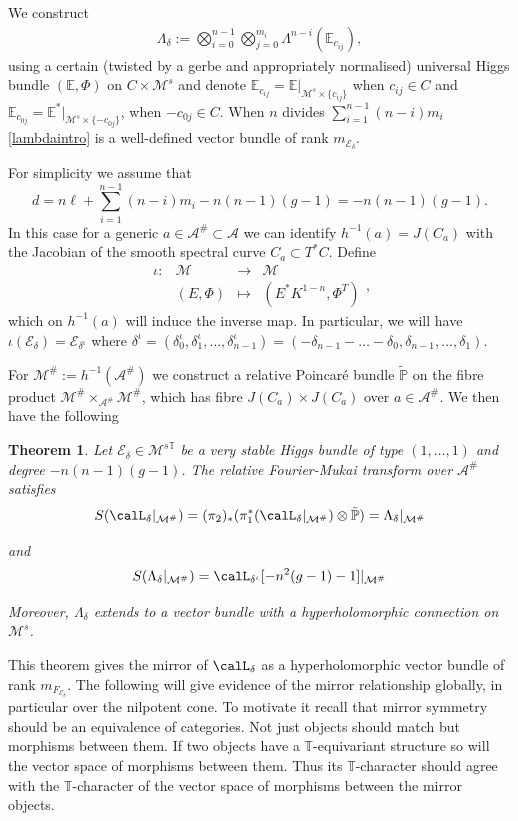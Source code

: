 \documentclass[12pt]{article}
\numberwithin{equation}{section}
\newtheorem{theorem}{Theorem}
\theoremstyle{remark}
\theoremstyle{definition}
\numberwithin{theorem}{section}
\def\beq{\begin{eqnarray}}
\def\eeq{\end{eqnarray}}
\def\bP{{\mathbb P}}
\def\calE{{\mathcal E}}
\def\bE{{\mathbb{E}}}
\def\bPhi{{\mathbb{\Phi}}}
\def\M{{\mathcal{M}}}
\def\calA{{\mathcal{A}}}
\newcommand{\T}{{\mathbb{T}}}
\renewcommand{\1}{\mathbbm{1}}
\begin{document}
We construct  \beq\label{lambdaintro}\Lambda_\delta:= \bigotimes_{i=0}^{n-1}\bigotimes_{j=0}^{m_i} \Lambda^{n-i}(\bE_{c_{ij}}),\eeq  using a certain (twisted by a gerbe and appropriately normalised) universal Higgs bundle $(\bE,\bPhi)$ on $C\times \M^s$ and denote $\bE_{c_{ij}}=\bE|_{\M^s\times{\{c_{ij}\}}}$ when $c_{ij}\in C$ and $\bE_{c_{0j}}=\bE^*|_{\M^s\times{\{-c_{0j}\}}}$, when $-c_{0j}\in C$. When $n$ divides $\sum_{i=1}^{n-1} (n-i)m_i$ \eqref{lambdaintro} is a well-defined vector bundle of rank $m_{\calE_\delta}$.

For simplicity we assume that $$d=n\ell+\sum_{i=1}^{n-1}(n-i)m_i-n(n-1)(g-1)=-n(n-1)(g-1).$$ In this case for a generic $a\in \calA^\#\subset \calA$  we can identify $h^{-1}(a)=J(C_a)$ with the Jacobian of the smooth spectral curve $C_a\subset T^*C$. Define $$\begin{array}{cccc}\iota:&\M&\to& \M \\ &(E,\Phi)&\mapsto& (E^*K^{1-n},\Phi^T)\end{array},$$ which on $h^{-1}(a)$ will induce the inverse map. In particular, we will have $\iota(\calE_\delta)=\calE_{\delta^\iota}$ where $\delta^\iota=(\delta^\iota_0,\delta^\iota_1,\dots,\delta^\iota_{n-1})=(-\delta_{n-1}-\dots-\delta_0, \delta_{n-1},\dots,\delta_1).$

For $\M^\#:=h^{-1}(\calA^\#)$ we  construct a relative Poincar\'e bundle $\tilde{\bP}$ on the fibre product $\M^\#\times_{\calA^\#}\M^\#$, which has fibre $J(C_a)\times J(C_a)$ over $a\in \calA^\#$. 
We then have the following 
\begin{theorem} \label{mainmirror} Let $\calE_\delta\in \M^{s\T}$ be a very stable Higgs bundle of type $(1,\dots,1)$ and degree $-n(n-1)(g-1)$.  The relative Fourier-Mukai transform over $\calA^\#$ satisfies $$S(\calL_\delta|_{\M^\#})=(\pi_2)_*(\pi_1^*(\calL_\delta|_{\M^\#})\otimes \tilde{\bP})= \Lambda_\delta|_{\M^\#}$$
	
	and 	$$S(\Lambda_\delta|_{\M^\#})=\calL_{\delta^\iota}[-n^2(g-1)-1]|_{\M^\#}$$
	
	Moreover,   $\Lambda_\delta$ extends to  a  vector bundle with a hyperholomorphic connection on $\M^s$. 
\end{theorem} 

This theorem gives the mirror of $\calL_\delta$  as a hyperholomorphic vector bundle of rank $m_{F_{\calE_\delta}}$. The following will give evidence of the mirror relationship globally, in particular over the nilpotent cone.  To motivate it recall that mirror symmetry should be an equivalence of categories. Not just objects should match but morphisms between them. If two objects have a $\T$-equivariant structure so will the vector space of morphisms between them. Thus its $\T$-character should agree with the $\T$-character of the vector space of morphisms between the mirror objects.
\end{document}
